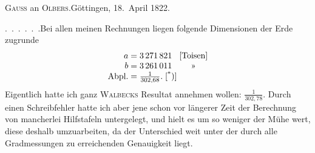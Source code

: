 \begin{center}
\textsc{Gauss} an \textsc{Olbers}.\quad Göttingen, 18.~April 1822.
\end{center}

\par\noindent\hspace*{\parindent}.\ .\ .\ .\ .\ .\quad Bei allen meinen Rechnungen liegen folgende Dimensionen der
Erde zugrunde
\[
\begin{array}{@{}r@{\;}c@{\;}l@{\;}c@{}}
a & = & 3\,271\,821 & \text{[Toisen]} \\
b & = & 3\,261\,011 & \text{»} \\
\text{Abpl.} & = & \tfrac{1}{302{,}68}.\;\text{[\textsuperscript{*})]} &
\end{array}
\]
Eigentlich hatte ich ganz \textsc{Walbecks} Resultat annehmen wollen: \(\frac{1}{302{,}78}\).
Durch einen Schreibfehler hatte ich aber jene schon vor längerer Zeit der Berechnung
von mancherlei Hilfstafeln untergelegt, und hielt es um so weniger der Mühe
wert, diese deshalb umzuarbeiten, da der Unterschied weit unter der durch
alle Gradmessungen zu erreichenden Genauigkeit liegt.
